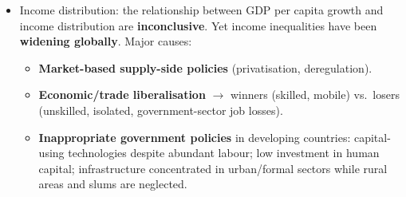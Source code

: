 \begin{itemize}
\begin{itemize}
  \item Greater emphasis on \textbf{human capital} (pollution-free) over physical capital.
  \item \textbf{Green investments}: public transport, building insulation, clean technology R\&D.
  \item Structural shifts toward \textbf{services} (less polluting) plus investment in resource protection.
\end{itemize}
However, even under ideal conditions there is a \textbf{maximum sustainable rate of growth}: pursuit of sustainability uses some resources (anti-pollution controls, regulation costs) representing an opportunity cost in terms of slightly lower growth --- but this only affects a portion of very high growth rates.
  \item Income distribution: the relationship between GDP per capita growth and income distribution are \textbf{inconclusive}. Yet income inequalities have been \textbf{widening globally}. Major causes:
\begin{itemize}
  \item \textbf{Market-based supply-side policies} (privatisation, deregulation).
  \item \textbf{Economic/trade liberalisation} $\to$ winners (skilled, mobile) vs.\ losers (unskilled, isolated, government-sector job losses).
  \item \textbf{Inappropriate government policies} in developing countries: capital-using technologies despite abundant labour; low investment in human capital; infrastructure concentrated in urban/formal sectors while rural areas and slums are neglected.
\end{itemize}
\end{itemize}
